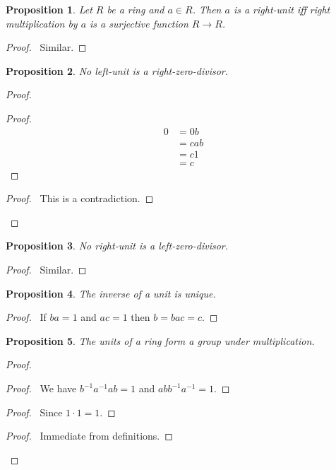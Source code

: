 \documentclass{book}
\let\qed\relax
\newtheorem{prop}{Proposition}[chapter]
\theoremstyle{definition}
\newcommand{\inv}[1]{\ensuremath{{#1}^{-1}}}
\begin{document}
\begin{prop}
Let $R$ be a ring and $a \in R$. Then $a$ is a right-unit iff right multiplication by $a$ is a surjective function $R \rightarrow R$.
\end{prop}

\begin{proof}
\pf\ Similar. \qed
\end{proof}

\begin{prop}
\label{prop:no-left-unit-is-a-right-zero-divisor}
No left-unit is a right-zero-divisor.
\end{prop}

\begin{proof}
\pf
{}
\begin{proof}
	\pf
	\begin{align*}
		0 & = 0b \\
		& = cab \\
		& = c1 \\
		& = c
	\end{align*}
\end{proof}
\qedstep
\begin{proof}
	\pf\ This is a contradiction.
\end{proof}
\qed
\end{proof}

\begin{prop}
\label{prop:no-right-unit-is-a-left-zero-divisor}
No right-unit is a left-zero-divisor.
\end{prop}

\begin{proof}
\pf\ Similar. \qed
\end{proof}

\begin{prop}
The inverse of a unit is unique.
\end{prop}

\begin{proof}
\pf\ If $ba = 1$ and $ac = 1$ then $b = bac = c$. \qed
\end{proof}

\begin{prop}
The units of a ring form a group under multiplication.
\end{prop}

\begin{proof}
\pf
{}
\begin{proof}
	\pf\ We have $\inv{b} \inv{a} a b = 1$ and $ab \inv{b} \inv{a} = 1$.
\end{proof}
\begin{proof}
	\pf\ Since $1 \cdot 1 = 1$.
\end{proof}
\begin{proof}
	\pf\ Immediate from definitions.
\end{proof}
\qed
\end{proof}
\end{document}
